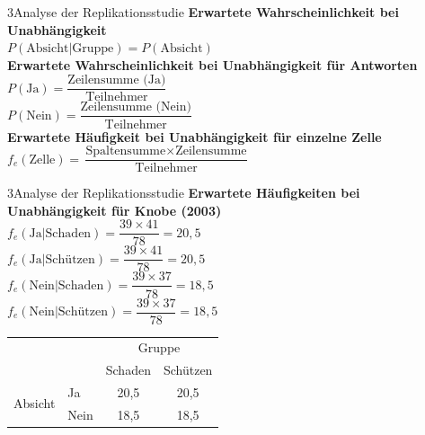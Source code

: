\documentclass[xcolor=table,9pt,aspectratio=169]{beamer}
\begin{document}
\begin{frame}{\vspace*{10mm}3\hspace*{1em}Analyse der Replikationsstudie}
\textbf{Erwartete Wahrscheinlichkeit bei Unabhängigkeit}\\
\smallskip
$P(\text{Absicht}|\text{Gruppe})=P(\text{Absicht})$\\

\bigskip
\textbf{Erwartete Wahrscheinlichkeit bei Unabhängigkeit für Antworten}\\
\smallskip
$P(\text{Ja})=\dfrac{\text{Zeilensumme (Ja)}}{\text{Teilnehmer}}$\\
\medskip
$P(\text{Nein})=\dfrac{\text{Zeilensumme (Nein)}}{\text{Teilnehmer}}$\\

\bigskip
\textbf{Erwartete Häufigkeit bei Unabhängigkeit für einzelne Zelle}\\
\smallskip
$f_{e}(\text{Zelle})=\dfrac{\text{Spaltensumme}\times\text{Zeilensumme}}{\text{Teilnehmer}}$\\
\end{frame}


\begin{frame}{\vspace*{10mm}3\hspace*{1em}Analyse der Replikationsstudie}
\textbf{Erwartete Häufigkeiten bei Unabhängigkeit für Knobe (2003)}\\
\smallskip
$f_{e}(\text{Ja}|\text{Schaden})=\dfrac{39\times41}{78}=20,5$\\
\smallskip
$f_{e}(\text{Ja}|\text{Schützen})=\dfrac{39\times41}{78}=20,5$\\
\smallskip
$f_{e}(\text{Nein}|\text{Schaden})=\dfrac{39\times37}{78}=18,5$\\
\smallskip
$f_{e}(\text{Nein}|\text{Schützen})=\dfrac{39\times37}{78}=18,5$\\

\bigskip
\begin{tabular}{llcc}
   \arrayrulecolor{blue2}\hline
                              &        & \multicolumn{2}{c}{Gruppe}   \\
                              &        & Schaden   & Schützen         \\
   \hline
   \multirow{2}{*}{Absicht}   & Ja     & 20,5      & 20,5             \\
                              & Nein   & 18,5      & 18,5             \\
   \hline
\end{tabular}
\end{frame}
\end{document}
